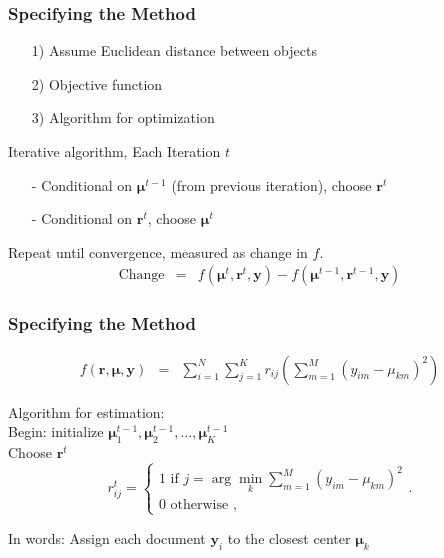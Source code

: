 \documentclass{beamer}
\numberwithin{equation}{section}
\begin{document}
\begin{frame}
\frametitle{Specifying the Method} 
\begin{itemize}
\item[1)] Assume Euclidean distance between objects 
\item[2)] Objective function
\item[3)] Algorithm for optimization
\end{itemize}


Iterative algorithm, Each Iteration $t$
\begin{itemize}
\item[-] Conditional on $\boldsymbol{\mu}^{t-1}$ (from previous iteration), choose $\boldsymbol{r}^{t}$
\item[-] Conditional on $\boldsymbol{r}^{t}$, choose $\boldsymbol{\mu}^{t}$
\end{itemize}
Repeat until convergence, measured as change in $f$.
\begin{eqnarray}
\text{Change} & = & f(\boldsymbol{\mu}^{t}, \boldsymbol{r}^{t}, \boldsymbol{y} ) - f(\boldsymbol{\mu}^{t-1}, \boldsymbol{r}^{t-1}, \boldsymbol{y} ) \nonumber 
\end{eqnarray}

 
\end{frame}


\begin{frame}
\frametitle{Specifying the Method}

\begin{eqnarray}
f(\boldsymbol{r}, \boldsymbol{\mu}, \boldsymbol{y}) & = & \sum_{i=1}^{N} \sum_{j=1}^{K} r_{ij} \left(\sum_{m=1}^{M} (y_{im} - \mu_{km})^{2} \right) \nonumber 
\end{eqnarray}


Algorithm for estimation: \\
Begin: initialize $\boldsymbol{\mu}_1^{t-1}, \boldsymbol{\mu}_2^{t-1}, \hdots, \boldsymbol{\mu}_K^{t-1}$\\
Choose $\boldsymbol{r}^{t}$
\begin{equation}
r_{ij}^{t} =  \left \{ \begin{array} {ll}
1 \text{ if } j = \arg\min_{k} \sum_{m=1}^{M} (y_{im} - \mu_{km} )^2 \\
0  \text{ otherwise } ,
\end{array} \right. . \nonumber
\end{equation}

In words: Assign each document $\boldsymbol{y}_i$ to the closest center $\boldsymbol{\mu}_k$

\end{frame}
\end{document}
